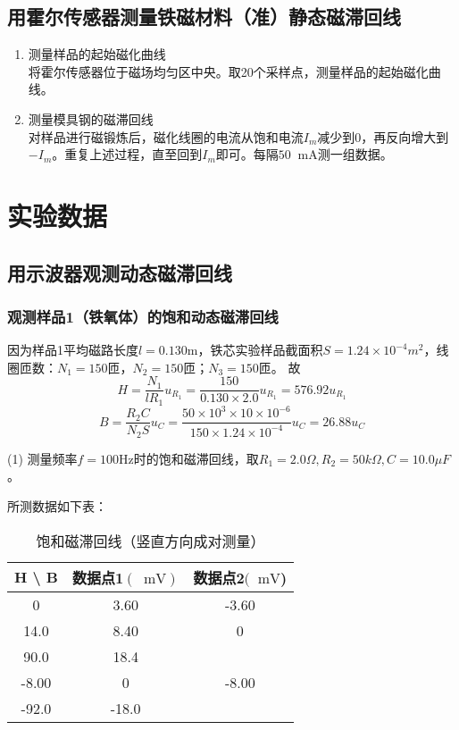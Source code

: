 \documentclass[11pt]{article}
\newcommand*{\unit}[1]{\mathop{}\!\mathrm{#1}}
\begin{document}
\subsection{用霍尔传感器测量铁磁材料（准）静态磁滞回线}

\begin{enumerate}
    \item 测量样品的起始磁化曲线 \\
    将霍尔传感器位于磁场均匀区中央。取20个采样点，测量样品的起始磁化曲线。
    \item 测量模具钢的磁滞回线 \\
    对样品进行磁锻炼后，磁化线圈的电流从饱和电流$I_m$减少到0，再反向增大到$-I_m$。重复上述过程，直至回到$I_m$即可。每隔$50\unit{mA}$测一组数据。
\end{enumerate}

\section{实验数据}

\subsection{用示波器观测动态磁滞回线}

\subsubsection{观测样品1（铁氧体）的饱和动态磁滞回线}

因为样品1平均磁路长度$l =0.130$m，铁芯实验样品截面积$S =1.24\times 10^{-4} m^2$，线圈匝数：$N_1 =150$匝，$N_2 =150$匝；$N_3 =150$匝。
故
\[
    H = \dfrac{N_1}{lR_1} u_{R_1} = \dfrac{150}{0.130\times 2.0} u_{R_1} = 576.92 u_{R_1}
\]
\[
    B = \dfrac{R_2 C}{N_2 S} u_C = \dfrac{50\times 10^3\times 10\times 10^{-6}}{150\times 1.24\times 10^{-4}} u_C = 26.88 u_C
\]

(1) 测量频率$f=100\text{Hz}$时的饱和磁滞回线，取$R_1=2.0\Omega,R_2=50k\Omega,C=10.0\mu F$。

所测数据如下表：

\begin{table}[H]
    \centering
    \begin{tabular}{|c|c|c|}
        \hline
        H \textbackslash{} B & 数据点1$(\unit{mV})$ & 数据点2$(\unit{mV}$) \\ \hline
        0 & 3.60 &-3.60 \\ \hline
        14.0 &8.40 & 0 \\ \hline
        90.0 & 18.4 & \\ \hline
        -8.00 & 0 & -8.00 \\ \hline
        -92.0 & -18.0 & \\ \hline
    \end{tabular}
    \caption{饱和磁滞回线（竖直方向成对测量）}
\end{table}
\end{document}
